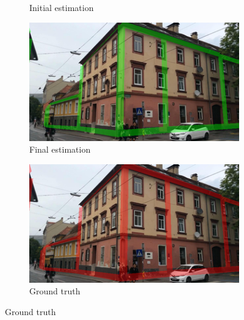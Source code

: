 \begin{figure}[htpb]
\begin{subfigure}{.18\textwidth}
\begin{center}
                        \caption{\label{subfig::init_pose} Initial estimation}
                    \end{center}
                \end{subfigure}
                \hfill
                \begin{subfigure}{.18\textwidth}
                    \begin{center}
                        \includegraphics[width=\textwidth]{images/introduction/3d_model_applications/pose_estimation/best_pose}
                        \caption{\label{subfig::final_pose} Final estimation}
                    \end{center}
                \end{subfigure}
                \hfill
                \begin{subfigure}{.18\textwidth}
                    \begin{center}
                        \includegraphics[width=\textwidth]{images/introduction/3d_model_applications/pose_estimation/ground_truth}
                        \caption{\label{subfig::gt_pose} Ground truth}
                    \end{center}

\end{subfigure}
\end{figure}
